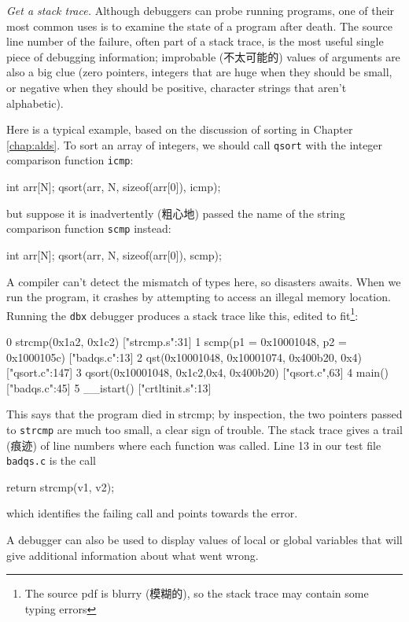 \emph{Get a stack trace.} Although debuggers can probe running programs,
one of their most common uses is to examine the state of a program after
death. The source line number of the failure, often part of a stack trace,
is the most useful single piece of debugging information; improbable
(不太可能的) values of arguments are also a big clue (zero pointers,
integers that are huge when they should be small, or negative when they
should be positive, character strings that aren't alphabetic).

Here is a typical example, based on the discussion of sorting in Chapter
\ref{chap:alds}. To sort an array of integers, we should call \verb'qsort'
with the integer comparison function \verb'icmp':
\begin{wellcode}
    int arr[N];
    qsort(arr, N, sizeof(arr[0]), icmp);
\end{wellcode}
but suppose it is inadvertently (粗心地) passed the name of the string
comparison function \verb'scmp' instead:
\begin{badcode}
    int arr[N];
    qsort(arr, N, sizeof(arr[0]), scmp);
\end{badcode}
A compiler can't detect the mismatch of types here, so disasters awaits.
When we run the program, it crashes by attempting to access an illegal
memory location. Running the \verb'dbx' debugger produces a stack trace
like this, edited to fit\footnote{The source pdf is blurry (模糊的), so the
    stack trace may contain some typing errors}:
\begin{wellcode}
    0 strcmp(0x1a2, 0x1c2) ["strcmp.s":31]
    1 scmp(p1 = 0x10001048, p2 = 0x1000105c) ["badqs.c":13]
    2 qst(0x10001048, 0x10001074, 0x400b20, 0x4) ["qsort.c":147]
    3 qsort(0x10001048, 0x1c2,0x4, 0x400b20) ["qsort.c",63]
    4 main() ["badqs.c":45]
    5 __istart() ["crtltinit.s":13]
\end{wellcode}
This says that the program died in strcmp; by inspection, the two pointers
passed to \verb'strcmp' are much too small, a clear sign of trouble. The
stack trace gives a trail (痕迹) of line numbers where each function was
called. Line 13 in our test file \verb'badqs.c' is the call 
\begin{wellcode}
    return strcmp(v1, v2);
\end{wellcode}
which identifies the failing call and points towards the error.

A debugger can also be used to display values of local or global variables
that will give additional information about what went wrong.

